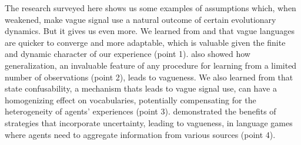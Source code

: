 \documentclass[a4paper]{article}
\begin{document}
The research surveyed here shows us some examples of assumptions which, when weakened, make vague signal use a natural outcome of certain evolutionary dynamics.
But it gives us even more.
We learned from \citeauthor{oconnor_evolution_2014} and \citeauthor{franke_vagueness_2017} that vague languages are quicker to converge and more adaptable, which is valuable given the finite and dynamic character of our experience (point 1).
\citeauthor{oconnor_evolving_2015} also showed how generalization, an invaluable feature of any procedure for learning from a limited number of observations (point 2), leads to vagueness.
We also learned from \citeauthor{franke_vagueness_2017} that state confusability, a mechanism thats leads to vague signal use, can have a homogenizing effect on vocabularies, potentially compensating for the heterogeneity of agents' experiences (point 3).
\citeauthor{lawry_vagueness_2017} demonstrated the benefits of strategies that incorporate uncertainty, leading to vagueness, in language games where agents need to aggregate information from various sources (point 4).
\end{document}
